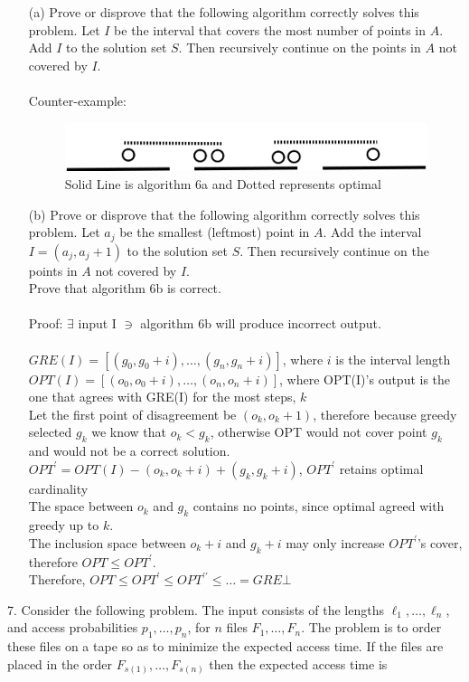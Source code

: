 \documentclass[10pt]{article}
\begin{document}
	\begin{enumerate}
		\item[(a)] Prove or disprove that the following algorithm correctly solves this problem. Let $I$ be the interval
		that covers the most number of points in $A$. Add $I$ to the solution set $S$. Then recursively continue on the points in 
		$A$ not covered by $I$.
		\\
		\\
		Counter-example: 
		
		\begin{figure}[h]
			\centering
				\caption{Solid Line is algorithm 6a and Dotted represents optimal}
				\includegraphics{counterexample7a.png}
		\end{figure}

		\item[(b)] Prove or disprove that the following algorithm correctly solves this problem. Let $a_{j}$ be the smallest
		(leftmost) point in $A$.  Add the interval $I = (a_{j} , a_{j} + 1)$ to the solution set $S$.  Then recursively
		continue on the points in $A$ not covered by $I$.
		\\
		Prove that algorithm 6b is correct.
		\\
		\\
		Proof: $\exists$ input I $\ni$ algorithm 6b will produce incorrect output.\\
		\\
		$GRE(I) = [(g_{0},g_{0} + i), \ldots, (g_{n}, g_{n} + i)]$, where $i$ is the interval length\\
		$OPT(I) = [(o_{0},o_{0} + i), \ldots, (o_{n}, o_{n} + i)]$, where OPT(I)'s output is the one that agrees with GRE(I) for the most steps, $k$\\
		Let the first point of disagreement be $(o_{k}, o_{k}+1)$, therefore because greedy selected $g_{k}$ we know that $o_{k} < g_{k}$, otherwise 
		OPT would not cover point $g_{k}$ and would not be a correct solution.\\ 
		$OPT^{\prime} = OPT(I) - (o_{k}, o_{k} + i) + (g_{k}, g_{k} + i)$, $OPT^{\prime}$ retains optimal cardinality \\
		The space between $o_{k}$ and $g_{k}$ contains no points, since optimal agreed with greedy up to $k$.\\
		The inclusion space between $o_{k}+i$ and $g_{k}+i$ may only increase $OPT^{\prime}$'s cover, therefore $OPT \leq OPT^{\prime}$.\\
		Therefore, $OPT \leq OPT^{\prime} \leq OPT^{\prime\prime} \leq \ldots = GRE \bot$ 
	\end{enumerate}
	7. Consider the following problem.  The input consists of the lengths $\ell_{1}, \ldots , \ell_{n}$, and access probabilities
		$p_{1} , \ldots , p_{n}$, for $n$ files $F_{1} , \ldots , F_{n}$.  The problem is to order these files on a tape so as to minimize the
		expected access time. If the files are placed in the order $F_{s(1)} , \ldots , F_{s(n)}$ then the expected access time
		is
		
\end{document}
